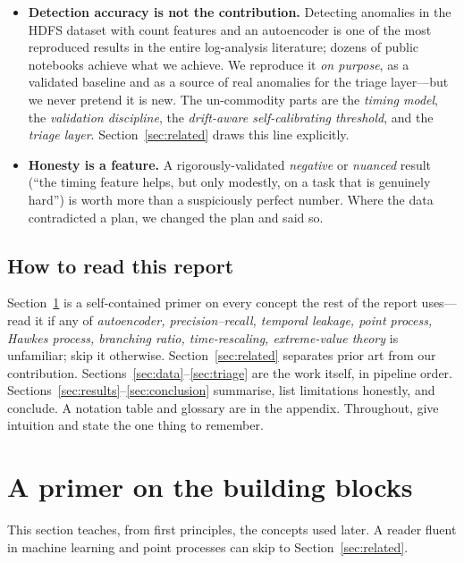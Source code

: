 \documentclass[11pt,a4paper]{article}
\begin{document}
\begin{itemize}[nosep,leftmargin=1.5em]
  \item \textbf{Detection accuracy is not the contribution.} Detecting anomalies
  in the HDFS dataset with count features and an autoencoder is one of the most
  reproduced results in the entire log-analysis literature; dozens of public
  notebooks achieve what we achieve. We reproduce it \emph{on purpose}, as a
  validated baseline and as a source of real anomalies for the triage layer---but
  we never pretend it is new. The un-commodity parts are the \emph{timing model},
  the \emph{validation discipline}, the \emph{drift-aware self-calibrating
  threshold}, and the \emph{triage layer}. Section~\ref{sec:related} draws this
  line explicitly.
  \item \textbf{Honesty is a feature.} A rigorously-validated \emph{negative} or
  \emph{nuanced} result (``the timing feature helps, but only modestly, on a task
  that is genuinely hard'') is worth more than a suspiciously perfect number.
  Where the data contradicted a plan, we changed the plan and said so.
\end{itemize}

\subsection{How to read this report}
Section~\ref{sec:primer} is a self-contained primer on every concept the rest of
the report uses---read it if any of \emph{autoencoder, precision--recall,
temporal leakage, point process, Hawkes process, branching ratio, time-rescaling,
extreme-value theory} is unfamiliar; skip it otherwise.
Section~\ref{sec:related} separates prior art from our contribution.
Sections~\ref{sec:data}--\ref{sec:triage} are the work itself, in pipeline order.
Sections~\ref{sec:results}--\ref{sec:conclusion} summarise, list limitations
honestly, and conclude. A notation table and glossary are in the appendix.
Throughout,  give intuition and
 state the one thing to remember.

\section{A primer on the building blocks}
\label{sec:primer}

This section teaches, from first principles, the concepts used later. A reader
fluent in machine learning and point processes can skip to
Section~\ref{sec:related}.
\end{document}
